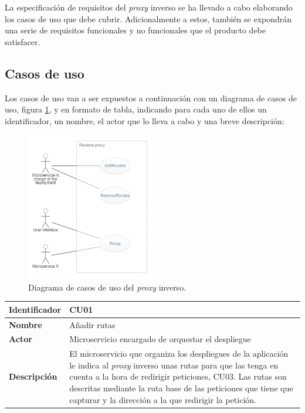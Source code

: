 \documentclass[11pt,spanish,listoffigures]{tfgetsinf}
\begin{document}
La especificación de requisitos del \emph{proxy} inverso se ha llevado a cabo elaborando los casos de uso que debe cubrir. Adicionalmente a estos, también se expondrán una serie de requisitos funcionales y no funcionales que el producto debe satisfacer.


		\subsection{Casos de uso}

Los casos de uso van a ser expuestos a continuación con un diagrama de casos de uso, figura \ref{diagramaCasosDeUso}, y en formato de tabla, indicando para cada uno de ellos un identificador, un nombre, el actor que lo lleva a cabo y una breve descripción:

\begin{figure}[ht]
\centering
\includegraphics[width=0.5\textwidth]{imagenes/diagramaCasosDeUso}
\caption{Diagrama de casos de uso del \emph{proxy} inverso.}
	\label{diagramaCasosDeUso}
\end{figure}

\begin{center} \begin{tabular}{| l | p{11.3cm} |}
\hline
\textbf{Identificador} & CU01
\\ \hline
\textbf{Nombre} & Añadir rutas
\\ \hline
\textbf{Actor} & Microservicio encargado de orquestar el despliegue
\\ \hline
\textbf{Descripción} & El microservicio que organiza los despliegues de la aplicación le indica al \emph{proxy} inverso unas rutas para que las tenga en cuenta a la hora de redirigir peticiones, CU03. Las rutas son descritas mediante la ruta base de las peticiones que tiene que capturar y la dirección a la que redirigir la petición.
\\ \hline \end{tabular} \end{center}
\end{document}
